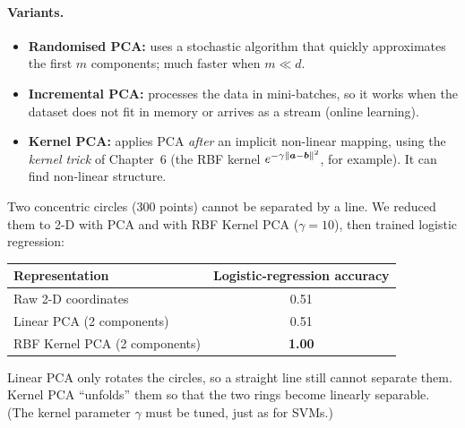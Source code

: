\paragraph{Variants.}

\begin{definition}
\begin{itemize}
  \item \textbf{Randomised PCA:} uses a stochastic algorithm that quickly approximates the first $m$ components; much faster when $m\ll d$.
  \item \textbf{Incremental PCA:} processes the data in mini-batches, so it works when the dataset does not fit in memory or arrives as a stream (online learning).
  \item \textbf{Kernel PCA:} applies PCA \emph{after} an implicit non-linear mapping, using the \emph{kernel trick} of Chapter~6 (the RBF kernel $e^{-\gamma\|\boldsymbol{a}-\boldsymbol{b}\|^2}$, for example). It can find non-linear structure.
\end{itemize}
\end{definition}

\begin{example}
Two concentric circles (300 points) cannot be separated by a line. We reduced them to 2-D with PCA and with RBF Kernel PCA ($\gamma=10$), then trained logistic regression:

\begin{center}
\begin{tabular}{@{}lc@{}}
\toprule
\textbf{Representation} & \textbf{Logistic-regression accuracy}\\
\midrule
Raw 2-D coordinates & 0.51\\
Linear PCA (2 components) & 0.51\\
RBF Kernel PCA (2 components) & \textbf{1.00}\\
\bottomrule
\end{tabular}
\end{center}
Linear PCA only rotates the circles, so a straight line still cannot separate them. Kernel PCA ``unfolds'' them so that the two rings become linearly separable. (The kernel parameter $\gamma$ must be tuned, just as for SVMs.)
\end{example}

